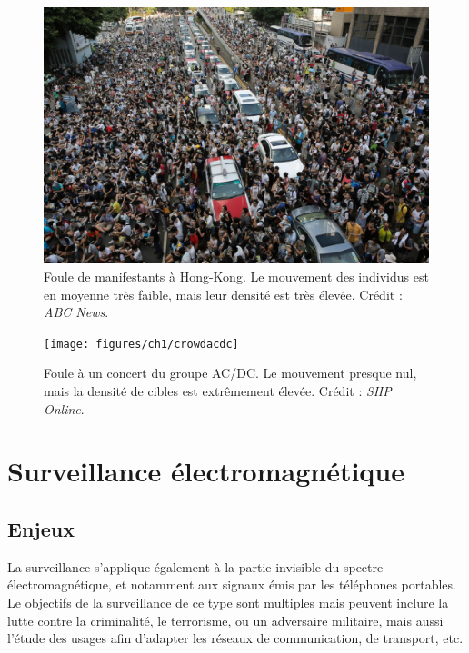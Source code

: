 	\begin{figure}[H]
		\centering
		\includegraphics[width=\textwidth]{figures/ch1/crowdhk}
		\caption[Foule de manifestants à Hong-Kong.]{Foule de manifestants à Hong-Kong. Le mouvement des individus est en moyenne très faible, mais leur densité est très élevée. Crédit : \emph{ABC News}\footnotemark.}
		\label{fig:crowdhk}
	\end{figure}
	
	
	\begin{figure}[H]
		\centering
		\texttt{[image: figures/ch1/crowdacdc]}
		\caption[Foule à un concert.]{Foule à un concert du groupe AC/DC. Le mouvement presque nul, mais la densité de cibles est extrêmement élevée. Crédit : \emph{SHP Online}\footnotemark.}
		\label{fig:crowdacdc}
	\end{figure}
	
	
	\section{Surveillance électromagnétique}
	\subsection{Enjeux}
	La surveillance s'applique également à la partie invisible du spectre électromagnétique, et notamment aux signaux émis par les téléphones portables.  Le objectifs de la surveillance de ce type sont multiples mais peuvent inclure la lutte contre la criminalité, le terrorisme, ou un adversaire militaire, mais aussi l'étude des usages afin d'adapter les réseaux de communication, de transport, etc.
	
